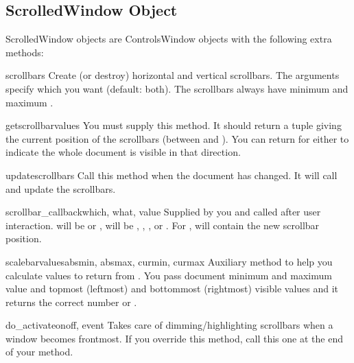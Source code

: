 \subsection{ScrolledWindow Object \label{scrolledwindow-object}}

ScrolledWindow objects are ControlsWindow objects with the following
extra methods:


\begin{methoddesc}[ScrolledWindow]{scrollbars}{}
Create (or destroy) horizontal and vertical scrollbars. The arguments
specify which you want (default: both). The scrollbars always have
minimum  and maximum .
\end{methoddesc}

\begin{methoddesc}[ScrolledWindow]{getscrollbarvalues}{}
You must supply this method. It should return a tuple  giving the current position of the scrollbars (between
 and ). You can return  for either to
indicate the whole document is visible in that direction.
\end{methoddesc}

\begin{methoddesc}[ScrolledWindow]{updatescrollbars}{}
Call this method when the document has changed. It will call
 and update the scrollbars.
\end{methoddesc}

\begin{methoddesc}[ScrolledWindow]{scrollbar_callback}{which, what, value}
Supplied by you and called after user interaction.  will
be  or ,  will be ,
, ,  or . For
,  will contain the new scrollbar position.
\end{methoddesc}

\begin{methoddesc}[ScrolledWindow]{scalebarvalues}{absmin, absmax,
                                                   curmin, curmax}
Auxiliary method to help you calculate values to return from
. You pass document minimum and maximum value
and topmost (leftmost) and bottommost (rightmost) visible values and
it returns the correct number or .
\end{methoddesc}

\begin{methoddesc}[ScrolledWindow]{do_activate}{onoff, event}
Takes care of dimming/highlighting scrollbars when a window becomes
frontmost. If you override this method, call this one at the end of
your method.
\end{methoddesc}


